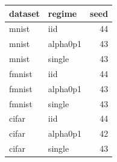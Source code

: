 \begin{tabular}{llr}
\toprule
dataset & regime & seed \\
\midrule
mnist & iid & 44 \\
mnist & alpha0p1 & 43 \\
mnist & single & 43 \\
fmnist & iid & 44 \\
fmnist & alpha0p1 & 43 \\
fmnist & single & 43 \\
cifar & iid & 44 \\
cifar & alpha0p1 & 42 \\
cifar & single & 43 \\
\bottomrule
\end{tabular}
